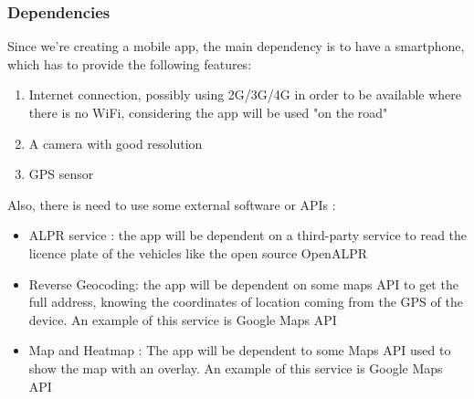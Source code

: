 \subsubsection{Dependencies} \label{Dependencies}
Since we're creating a mobile app, the main dependency is to have a smartphone, which has to provide the following features:
\begin{enumerate}
  \item Internet connection, possibly using 2G/3G/4G in order to be available where there is no WiFi, considering the app will be used "on the road"
  \item A camera with good resolution
  \item GPS sensor
\end{enumerate}

Also, there is need to use some external software or APIs :
\begin{itemize}
  \item ALPR service :  the app will be dependent on a third-party service to read the licence plate of the vehicles like the open source OpenALPR \cite{openalprdoc}

  \item Reverse Geocoding: the app will be dependent on some maps API to get the full address, knowing the coordinates of location coming from the GPS of the device. An example of this service is Google Maps API \cite{GMapGeocode}

  \item Map and Heatmap : The app will be dependent to some Maps API used to show the map with an overlay. An example of this service is Google Maps API \cite{GMapsHeat}
\end{itemize}
